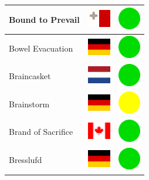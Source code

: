 \documentclass[12pt, a4paper, twoside]{report}
\begin{document}
\begin{center}
\begin{longtable}{|p{5cm}|p{2cm}|p{2cm}|}
 Bound to Prevail                                           & \includegraphics[width=1cm]{../img/flags/mt} &   \includegraphics[width=1cm]{../likes/y} \\ \hline
 Bowel Evacuation                                           & \includegraphics[width=1cm]{../img/flags/de} &   \includegraphics[width=1cm]{../likes/y} \\ \hline
 Braincasket                                                & \includegraphics[width=1cm]{../img/flags/nl} &   \includegraphics[width=1cm]{../likes/y} \\ \hline
 Brainstorm                                                 & \includegraphics[width=1cm]{../img/flags/de} &   \includegraphics[width=1cm]{../likes/m} \\ \hline
 Brand of Sacrifice                                         & \includegraphics[width=1cm]{../img/flags/ca} &   \includegraphics[width=1cm]{../likes/y} \\ \hline
 Bresslufd                                                  & \includegraphics[width=1cm]{../img/flags/de} &   \includegraphics[width=1cm]{../likes/y} \\ \hline

\end{longtable}
\end{center}
\end{document}
